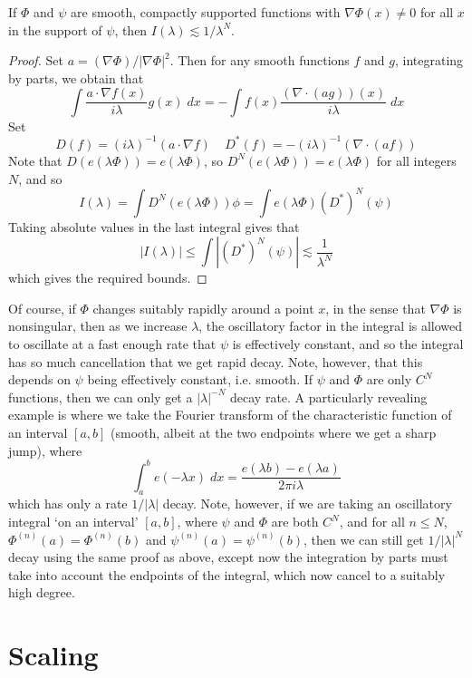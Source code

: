 \begin{theorem}
    If $\Phi$ and $\psi$ are smooth, compactly supported functions with $\nabla \Phi(x) \neq 0$ for all $x$ in the support of $\psi$, then $I(\lambda) \lesssim 1/\lambda^N$.
\end{theorem}
\begin{proof}
    Set $a = (\nabla \Phi)/|\nabla \Phi|^2$. Then for any smooth functions $f$ and $g$, integrating by parts, we obtain that
    \[ \int \frac{a \cdot \nabla f(x)}{i \lambda} g(x)\; dx = - \int f(x) \frac{(\nabla \cdot (ag))(x)}{i \lambda}\; dx \]
    Set
    \[ D(f) = (i \lambda)^{-1} (a \cdot \nabla f)\ \ \ \ \ D^*(f) = - (i\lambda)^{-1} (\nabla \cdot (af)) \]
    Note that $D(e(\lambda \Phi)) = e(\lambda \Phi)$, so $D^N(e(\lambda \Phi)) = e(\lambda \Phi)$ for all integers $N$, and so
    \[ I(\lambda) = \int D^N(e(\lambda \Phi)) \phi = \int e(\lambda \Phi) (D^*)^N(\psi) \]
    Taking absolute values in the last integral gives that
    \[ |I(\lambda)| \leq \int |(D^*)^N(\psi)| \lesssim \frac{1}{\lambda^N} \]
    which gives the required bounds.
\end{proof}

Of course, if $\Phi$ changes suitably rapidly around a point $x$, in the sense that $\nabla \Phi$ is nonsingular, then as we increase $\lambda$, the oscillatory factor in the integral is allowed to oscillate at a fast enough rate that $\psi$ is effectively constant, and so the integral has so much cancellation that we get rapid decay. Note, however, that this depends on $\psi$ being effectively constant, i.e. smooth. If $\psi$ and $\Phi$ are only $C^N$ functions, then we can only get a $|\lambda|^{-N}$ decay rate. A particularly revealing example is where we take the Fourier transform of the characteristic function of an interval $[a,b]$ (smooth, albeit at the two endpoints where we get a sharp jump), where
%
\[ \int_a^b e(- \lambda x)\; dx = \frac{e(\lambda b) - e(\lambda a)}{2 \pi i \lambda} \]
%
which has only a rate $1/|\lambda|$ decay. Note, however, if we are taking an oscillatory integral `on an interval' $[a,b]$, where $\psi$ and $\Phi$ are both $C^N$, and for all $n \leq N$, $\Phi^{(n)}(a) = \Phi^{(n)}(b)$ and $\psi^{(n)}(a) = \psi^{(n)}(b)$, then we can still get $1/|\lambda|^N$ decay using the same proof as above, except now the integration by parts must take into account the endpoints of the integral, which now cancel to a suitably high degree.

\section{Scaling}


